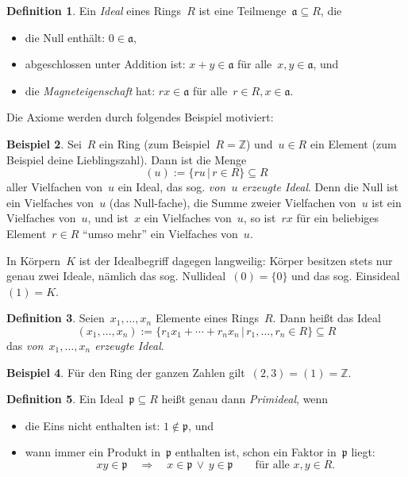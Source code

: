 \documentclass[a4paper,ngerman,12pt]{scrartcl}
\theoremstyle{definition}
\newtheorem{defn}{Definition}[section]
\newtheorem{bsp}[defn]{Beispiel}
\theoremstyle{plain}
\theoremstyle{remark}
\newcommand{\ZZ}{\mathbb{Z}}
\renewcommand{\aa}{\mathfrak{a}}
\newcommand{\pp}{\mathfrak{p}}
\renewcommand{\_}{\mathpunct{.}\,}
\newcommand{\?}{\,{:}\,}
\begin{document}
\begin{defn}Ein \emph{Ideal} eines Rings~$R$ ist eine Teilmenge~$\aa \subseteq R$, die
\begin{itemize}
\item die Null enthält: $0 \in \aa$,
\item abgeschlossen unter Addition ist: $x + y \in \aa$ für alle~$x,y \in \aa$, und
\item die \emph{Magneteigenschaft} hat: $r x \in \aa$ für alle~$r \in R, x
\in \aa$.
\end{itemize}
\end{defn}

Die Axiome werden durch folgendes Beispiel motiviert:

\begin{bsp}Sei~$R$ ein Ring (zum Beispiel~$R = \ZZ$) und~$u \in R$ ein Element
(zum Beispiel deine Lieblingszahl). Dann ist die Menge
\[ (u) := \{ r u \,|\, r \in R \} \subseteq R \]
aller Vielfachen von~$u$ ein Ideal, das sog. \emph{von~$u$ erzeugte Ideal}.
Denn die Null ist ein Vielfaches von~$u$ (das Null-fache), die Summe zweier
Vielfachen von~$u$ ist ein Vielfaches von~$u$, und ist~$x$ ein Vielfaches
von~$u$, so ist~$r x$ für ein beliebiges Element~$r \in R$ "`umso mehr"' ein
Vielfaches von~$u$.
\end{bsp}

In Körpern~$K$ ist der Idealbegriff dagegen langweilig: Körper besitzen stets nur
genau zwei Ideale, nämlich das sog. Nullideal~$(0) = \{ 0 \}$ und das sog.
Einsideal~$(1) = K$.

\begin{defn}\label{def:idealerz}Seien~$x_1,\ldots,x_n$ Elemente eines
Rings~$R$. Dann heißt das Ideal
\[ (x_1,\ldots,x_n) := \{ r_1 x_1 + \cdots + r_n x_n \,|\, r_1,\ldots,r_n \in R
\} \subseteq R \]
das \emph{von~$x_1,\ldots,x_n$ erzeugte Ideal}.\end{defn}

\begin{bsp}Für den Ring der ganzen Zahlen gilt~$(2,3) = (1) = \ZZ$.\end{bsp}

\begin{defn}Ein Ideal~$\pp \subseteq R$ heißt genau dann \emph{Primideal}, wenn
\begin{itemize}
\item die Eins nicht enthalten ist: $1 \not\in \pp$, und
\item wann immer ein Produkt in~$\pp$ enthalten ist, schon ein Faktor in~$\pp$
liegt:
\[ xy \in \pp \quad\Longrightarrow\quad x \in \pp \,\vee\, y \in \pp
  \qquad\text{für alle~$x,y \in R$.} \]
\end{itemize}
\end{defn}
\end{document}
